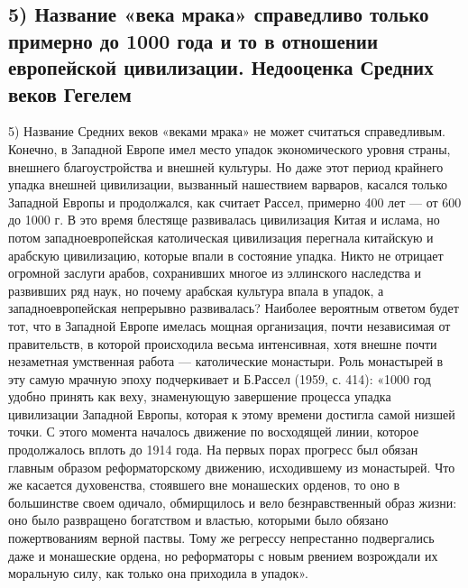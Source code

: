 \subsection{5) Название  «века мрака»  справедливо только  примерно до
1000 года и то в отношении европейской цивилизации. Недооценка Средних
веков Гегелем}

5)  Название   Средних  веков   «веками  мрака»  не   может  считаться
справедливым.   Конечно,  в   Западной   Европе   имел  место   упадок
экономического  уровня  страны,  внешнего  благоустройства  и  внешней
культуры.  Но даже  этот период  крайнего упадка  внешней цивилизации,
вызванный  нашествием  варваров,  касался  только  Западной  Европы  и
продолжался, как считает  Рассел, примерно 400 лет --- от  600 до 1000
г. В  это время  блестяще развивалась цивилизация  Китая и  ислама, но
потом западноевропейская католическая  цивилизация перегнала китайскую
и арабскую  цивилизацию, которые  впали в  состояние упадка.  Никто не
отрицает  огромной заслуги  арабов, сохранивших  многое из  эллинского
наследства и  развивших ряд  наук, но  почему арабская  культура впала
в  упадок,  а   западноевропейская  непрерывно  развивалась?  Наиболее
вероятным  ответом будет  тот, что  в Западной  Европе имелась  мощная
организация, почти независимая от  правительств, в которой происходила
весьма интенсивная, хотя внешне почти незаметная умственная работа ---
католические  монастыри. Роль  монастырей  в эту  самую мрачную  эпоху
подчеркивает и Б.Рассел  (1959, с. 414): «1000 год  удобно принять как
веху,  знаменующую  завершение  процесса упадка  цивилизации  Западной
Европы, которая к  этому времени достигла самой низшей  точки. С этого
момента началось  движение по  восходящей линии,  которое продолжалось
вплоть  до 1914  года. На  первых  порах прогресс  был обязан  главным
образом реформаторскому  движению, исходившему  из монастырей.  Что же
касается  духовенства,  стоявшего вне  монашеских  орденов,  то оно  в
большинстве своем  одичало, обмирщилось  и вело  безнравственный образ
жизни:  оно  было  развращено  богатством  и  властью,  которыми  было
обязано  пожертвованиям верной  паствы. Тому  же регрессу  непрестанно
подвергались даже и монашеские ордена,  но реформаторы с новым рвением
возрождали их моральную силу, как только она приходила в упадок».

